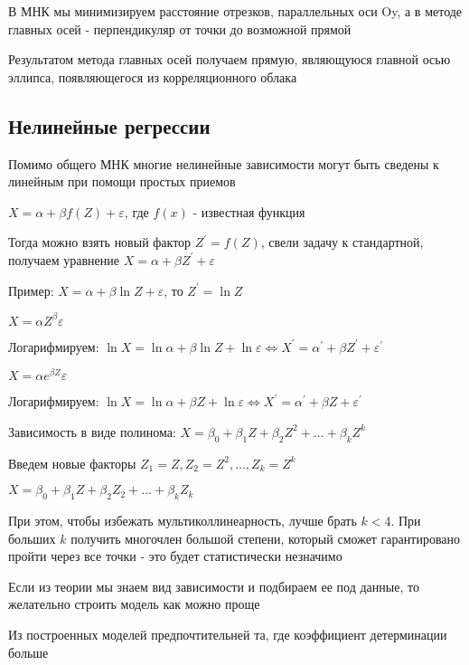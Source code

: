 В МНК мы минимизируем расстояние отрезков, параллельных оси Oy, а в методе главных осей - перпендикуляр от точки до возможной прямой

Результатом метода главных осей получаем прямую, являющуюся главной осью эллипса, появляющегося из корреляционного облака

\subsection{Нелинейные регрессии}

Помимо общего МНК многие нелинейные зависимости могут быть сведены к линейным при помощи простых приемов

 $X = \alpha + \beta f(Z) + \varepsilon$, где $f(x)$ - известная функция

Тогда можно взять новый фактор $Z^\prime = f(Z)$, свели задачу к стандартной, получаем уравнение $X = \alpha + \beta Z^\prime + \varepsilon$

Пример: $X = \alpha + \beta \ln Z + \varepsilon$, то $Z^\prime = \ln Z$

 $X = \alpha Z^\beta \varepsilon$

Логарифмируем: $\ln X = \ln \alpha + \beta \ln Z + \ln \varepsilon \Longleftrightarrow X^\prime = \alpha^\prime + \beta Z^\prime + \varepsilon^\prime$

 $X = \alpha e^{\beta Z} \varepsilon$

Логарифмируем: $\ln X = \ln \alpha + \beta Z + \ln \varepsilon \Longleftrightarrow X^\prime = \alpha^\prime + \beta Z + \varepsilon^\prime$

 Зависимость в виде полинома: $X = \beta_0 + \beta_1 Z + \beta_2 Z^2 + \dots + \beta_k Z^k$

Введем новые факторы $Z_1 = Z, Z_2 = Z^2, \dots, Z_k = Z^k$

$X = \beta_0 + \beta_1 Z + \beta_2 Z_2 + \dots + \beta_k Z_k$

При этом, чтобы избежать мультиколлинеарность, лучше брать $k < 4$. При больших $k$ получить многочлен большой степени, который сможет гарантировано пройти через все точки - это будет статистически незначимо


\Nota Если из теории мы знаем вид зависимости и подбираем ее под данные, то желательно строить модель как можно проще

\Notas Из построенных моделей предпочтительней та, где коэффициент детерминации больше

\mediumvspace

